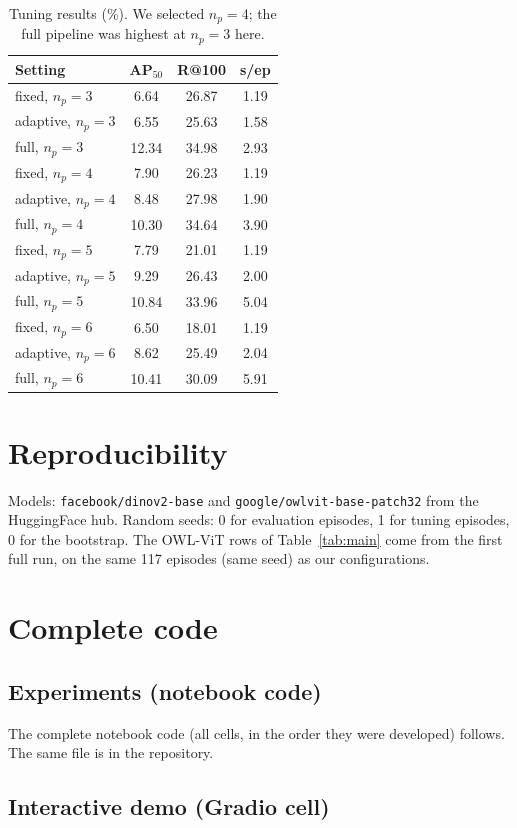 \documentclass[10pt,twocolumn,letterpaper]{article}
\newcommand{\ap}{AP$_{50}$}
\begin{document}
\begin{table}[h]
\centering\small
\begin{tabular}{@{}lccc@{}}
\toprule
Setting & \ap{} & R@100 & s/ep\\
\midrule
fixed, $n_p{=}3$ & 6.64 & 26.87 & 1.19\\
adaptive, $n_p{=}3$ & 6.55 & 25.63 & 1.58\\
full, $n_p{=}3$ & 12.34 & 34.98 & 2.93\\
fixed, $n_p{=}4$ & 7.90 & 26.23 & 1.19\\
adaptive, $n_p{=}4$ & 8.48 & 27.98 & 1.90\\
full, $n_p{=}4$ & 10.30 & 34.64 & 3.90\\
fixed, $n_p{=}5$ & 7.79 & 21.01 & 1.19\\
adaptive, $n_p{=}5$ & 9.29 & 26.43 & 2.00\\
full, $n_p{=}5$ & 10.84 & 33.96 & 5.04\\
fixed, $n_p{=}6$ & 6.50 & 18.01 & 1.19\\
adaptive, $n_p{=}6$ & 8.62 & 25.49 & 2.04\\
full, $n_p{=}6$ & 10.41 & 30.09 & 5.91\\
\bottomrule
\end{tabular}
\caption{Tuning results (\%). We selected $n_p=4$; the full pipeline was highest at $n_p=3$ here.}
\end{table}

\section{Reproducibility}
Models: \texttt{facebook/dinov2-base} and \texttt{google/owlvit-base-patch32} from the HuggingFace hub. Random seeds: 0 for evaluation episodes, 1 for tuning episodes, 0 for the bootstrap. The OWL-ViT rows of Table~\ref{tab:main} come from the first full run, on the same 117 episodes (same seed) as our configurations.

\section{Complete code}
\label{app:code}
\subsection{Experiments (notebook code)}
The complete notebook code (all cells, in the order they were developed) follows. The same file is in the repository.



\subsection{Interactive demo (Gradio cell)}

\end{document}
